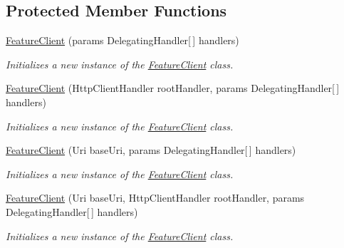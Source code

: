 \subsection*{Protected Member Functions}
\begin{DoxyCompactItemize}
\item 
\hyperlink{class_microsoft_1_1_azure_1_1_management_1_1_resources_1_1_feature_client_af2f4eef7afd7d5438667d2599e8d3b29}{Feature\+Client} (params Delegating\+Handler\mbox{[}$\,$\mbox{]} handlers)
\begin{DoxyCompactList}\small\item\em Initializes a new instance of the \hyperlink{class_microsoft_1_1_azure_1_1_management_1_1_resources_1_1_feature_client}{Feature\+Client} class. \end{DoxyCompactList}\item 
\hyperlink{class_microsoft_1_1_azure_1_1_management_1_1_resources_1_1_feature_client_a8ba9130cd506de9958e4b9a152b70bdf}{Feature\+Client} (Http\+Client\+Handler root\+Handler, params Delegating\+Handler\mbox{[}$\,$\mbox{]} handlers)
\begin{DoxyCompactList}\small\item\em Initializes a new instance of the \hyperlink{class_microsoft_1_1_azure_1_1_management_1_1_resources_1_1_feature_client}{Feature\+Client} class. \end{DoxyCompactList}\item 
\hyperlink{class_microsoft_1_1_azure_1_1_management_1_1_resources_1_1_feature_client_a37ed3dbc886e58fd67c69304e5479b83}{Feature\+Client} (Uri base\+Uri, params Delegating\+Handler\mbox{[}$\,$\mbox{]} handlers)
\begin{DoxyCompactList}\small\item\em Initializes a new instance of the \hyperlink{class_microsoft_1_1_azure_1_1_management_1_1_resources_1_1_feature_client}{Feature\+Client} class. \end{DoxyCompactList}\item 
\hyperlink{class_microsoft_1_1_azure_1_1_management_1_1_resources_1_1_feature_client_a969baf3e5fe72b5287eddc4ba8d7bcf9}{Feature\+Client} (Uri base\+Uri, Http\+Client\+Handler root\+Handler, params Delegating\+Handler\mbox{[}$\,$\mbox{]} handlers)
\begin{DoxyCompactList}\small\item\em Initializes a new instance of the \hyperlink{class_microsoft_1_1_azure_1_1_management_1_1_resources_1_1_feature_client}{Feature\+Client} class. \end{DoxyCompactList}\end{DoxyCompactItemize}
